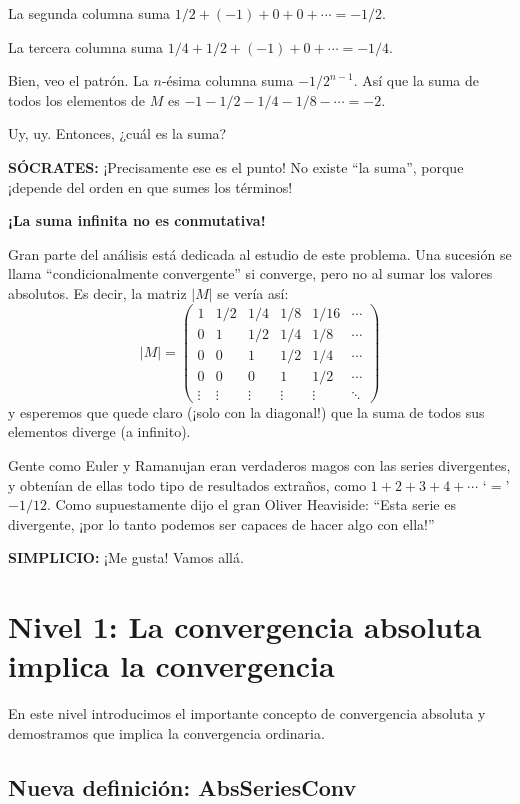La segunda columna suma $1/2 + (-1) + 0 + 0 + \cdots = -1/2$.

La tercera columna suma $1/4 + 1/2 + (-1) + 0 + \cdots = -1/4$.

Bien, veo el patrón. La $n$-ésima columna suma $-1/2^{n-1}$. Así que la suma de todos los elementos de $M$ es $-1 - 1/2 - 1/4 - 1/8 - \cdots = -2$.

Uy, uy. Entonces, ¿cuál es la suma?

\medskip
\noindent\textbf{SÓCRATES:} ¡Precisamente ese es el punto! No existe ``la suma'', porque ¡depende del orden en que sumes los términos!

\textbf{¡La suma infinita no es conmutativa!}

Gran parte del análisis está dedicada al estudio de este problema. Una sucesión se llama ``condicionalmente convergente'' si converge, pero no al sumar los valores absolutos. Es decir, la matriz $|M|$ se vería así:
\[
|M| =
\begin{pmatrix}
1 & 1/2 & 1/4 & 1/8 & 1/16 & \cdots\\
0 & 1 & 1/2 & 1/4 & 1/8 & \cdots\\
0 & 0 & 1 & 1/2 & 1/4 & \cdots\\
0 & 0 & 0 & 1 & 1/2 & \cdots\\
\vdots & \vdots & \vdots & \vdots & \vdots & \ddots
\end{pmatrix}
\]
y esperemos que quede claro (¡solo con la diagonal!) que la suma de todos sus elementos diverge (a infinito).

Gente como Euler y Ramanujan eran verdaderos magos con las series divergentes, y obtenían de ellas todo tipo de resultados extraños, como $1 + 2 + 3 + 4 + \cdots$ `$=$' $-1/12$. Como supuestamente dijo el gran Oliver Heaviside: ``Esta serie es divergente, ¡por lo tanto podemos ser capaces de hacer algo con ella!''

\medskip
\noindent\textbf{SIMPLICIO:} ¡Me gusta! Vamos allá.

\section{Nivel 1: La convergencia absoluta implica la convergencia}

En este nivel introducimos el importante concepto de convergencia absoluta y demostramos que implica la convergencia ordinaria.

\subsection{Nueva definición: AbsSeriesConv}


